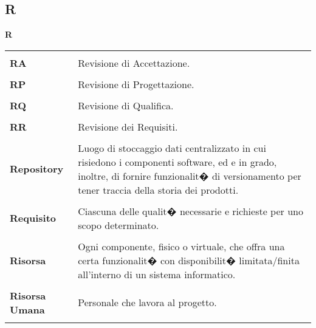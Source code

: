 {\subsection{R} 
\hfill\Huge{\textbf{R}} \\ 
\normalsize 
\begin{longtabu} to 
\toprule \\ 
\textbf{RA} & Revisione di Accettazione. \\ 
 \\ 
\textbf{RP} & Revisione di Progettazione. \\ 
 \\ 
\textbf{RQ} & Revisione di Qualifica. \\ 
 \\ 
\textbf{RR} & Revisione dei Requisiti. \\ 
 \\ 
\textbf{Repository} & Luogo di stoccaggio dati centralizzato in cui risiedono i componenti software, ed e in grado, inoltre, di fornire funzionalit� di versionamento per tener traccia della storia dei prodotti. \\ 
 \\ 
\textbf{Requisito} & Ciascuna delle qualit� necessarie e richieste per uno scopo determinato. \\ 
 \\ 
\textbf{Risorsa} & Ogni componente, fisico o virtuale, che offra una certa funzionalit� con disponibilit� limitata/finita all'interno di un sistema informatico. \\ 
 \\ 
\textbf{Risorsa Umana} & Personale che lavora al progetto. \\ 
 \\ 
\end{longtabu} 
\newpage 
}
